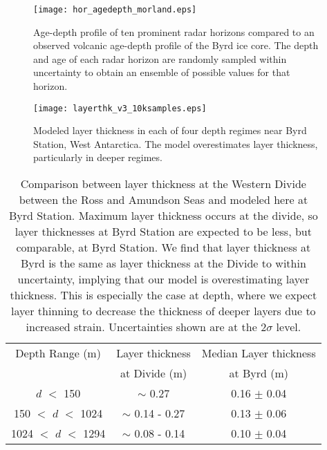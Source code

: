 \documentclass[12pt]{article}
\begin{document}
\begin{figure}
\begin{center}
\texttt{[image: hor\_agedepth\_morland.eps]}
\label{horagedepth}
\captionsetup{width=.9\textwidth}
\caption{ Age-depth profile of ten prominent radar horizons compared to an observed volcanic age-depth profile of the Byrd ice core. The depth and age of each radar horizon are randomly sampled within uncertainty to obtain an ensemble of possible values for that horizon.  }
\end{center}
\end{figure}


\begin{figure}\label{accum}
\begin{center}
\texttt{[image: layerthk\_v3\_10ksamples.eps]}
\end{center}
\captionsetup{width=.9\textwidth}
\caption{Modeled layer thickness in each of four depth regimes near Byrd Station, West Antarctica. The model overestimates layer thickness, particularly in deeper regimes. }
\end{figure}


\begin{table}\label{accums}
\centering
\begin{tabular}{|c|c|c|}
\hline
Depth Range (m) & \multicolumn{1}{c|}{Layer thickness} & \multicolumn{1}{c|}{Median Layer thickness}  \\
& at Divide (m) & at Byrd  (m)\\
\hline
$\textit{d}$ $<$ 150 & $\sim$ 0.27 &  0.16 $\pm$ 0.04\\
150 $<$ $\textit{d}$ $<$ 1024 & $\sim$ 0.14 - 0.27 & 0.13  $\pm$ 0.06\\
1024 $<$ $\textit{d}$ $<$ 1294 & $\sim$ 0.08 - 0.14 & 0.10 $\pm$ 0.04\\
\hline
\end{tabular}
\captionsetup{width=.9\textwidth}
\caption{Comparison between layer thickness at the Western Divide between the Ross and Amundson Seas \citep{neumann2008} and modeled here at Byrd Station. Maximum layer thickness occurs at the divide, so layer thicknesses at Byrd Station are expected to be less, but comparable, at Byrd Station. We find that layer thickness at Byrd is the same as layer thickness at the Divide to within uncertainty, implying that our model is overestimating layer thickness. This is especially the case at depth, where we expect layer thinning to decrease the thickness of deeper layers due to increased strain. Uncertainties shown are at the 2$\sigma$ level.}
\end{table}
\end{document}
